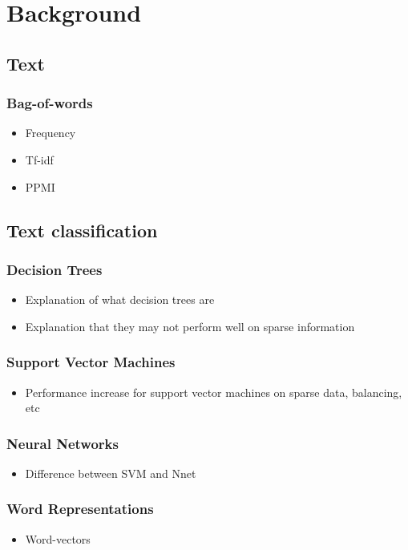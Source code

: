 \chapter{Background}
\section{Text}
\subsection{Bag-of-words}
\begin{itemize}
	\item Frequency
	\item Tf-idf
	\item PPMI
\end{itemize}
\section{Text classification}
\subsection{Decision Trees}
\begin{itemize}
	\item Explanation of what decision trees are
	\item Explanation that they may not perform well on sparse information
\end{itemize}
\subsection{Support Vector Machines}
\begin{itemize}
	\item Performance increase for support vector machines on sparse data, balancing, etc
\end{itemize}
\subsection{Neural Networks}
\begin{itemize}
	\item Difference between SVM and Nnet
\end{itemize}
\subsection{Word Representations}
\begin{itemize}
	\item Word-vectors
\end{itemize}
